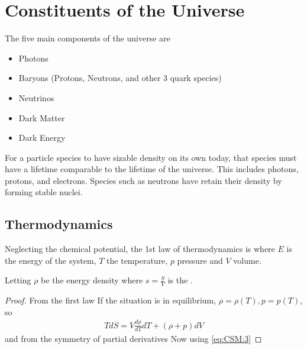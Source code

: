 \documentclass{article}
\begin{document}
\section{Constituents of the Universe}
The five main components of the universe are 
\begin{itemize}
    \item Photons
    \item Baryons (Protons, Neutrons, and other 3 quark species)
    \item Neutrinos
    \item Dark Matter 
    \item Dark Energy
\end{itemize}
For a particle species to have sizable density on its own today, that species must have a lifetime comparable to the lifetime of the universe. This includes photons, protons, and electrons. Species such as neutrons have retain their density by forming stable nuclei. 

\subsection{Thermodynamics}
\begin{definition}
Neglecting the chemical potential, the 1st law of thermodynamics is 
where $E$ is the energy of the system, $T$ the temperature, $p$ pressure and $V$ volume. 
\end{definition}

\begin{prop}
Letting $\rho$ be the energy density
where $s=\frac{S}{V}$ is the .
\end{prop}
\begin{proof}
From the first law
If the situation is in equilibrium, $\rho=\rho(T), p=p(T)$, so 
\begin{align} \label{eq:CSM:3}
TdS = V \frac{d\rho}{dT} dT + (\rho + p) dV
\end{align}
and from the symmetry of partial derivatives 
Now using \ref{eq:CSM:3} 
\end{proof}
\end{document}
